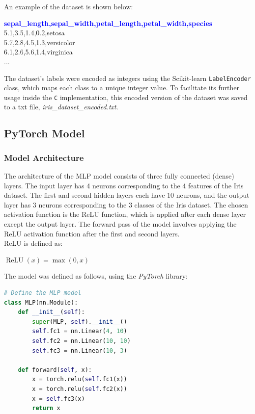 \documentclass{article}
\begin{document}
An example of the dataset is shown below:

\begin{tcolorbox}[colback=gray!5, colframe=black, rounded corners, boxrule=0.1mm]
\textbf{\textcolor{blue}{sepal\_length,sepal\_width,petal\_length,petal\_width,species}} \\
5.1,3.5,1.4,0.2,setosa \\
5.7,2.8,4.5,1.3,versicolor \\
6.1,2.6,5.6,1.4,virginica \\
...
\end{tcolorbox}

The dataset's labels were encoded as integers using the Scikit-learn \texttt{LabelEncoder} class, which maps each class to a unique integer value.
To facilitate its further usage inside the \texttt{C} implementation, this encoded version of the dataset was saved to a txt file, \textit{iris\_dataset\_encoded.txt}.

\subsection{PyTorch Model}
\subsubsection{Model Architecture}
The architecture of the MLP model consists of three fully connected (dense) layers.
The input layer has 4 neurons corresponding to the 4 features of the Iris dataset. 
The first and second hidden layers each have 10 neurons, and the output layer has 3 neurons corresponding to the 3 classes of the Iris dataset.
The chosen activation function is the ReLU function, which is applied after each dense layer except the output layer.
The forward pass of the model involves applying the ReLU activation function after the first and second layers.
\\ReLU is defined as:
\begin{center}
$\operatorname{ReLU}(x) = \max(0, x)$
\end{center}
The model was defined as follows, using the \textit{PyTorch} library:
\begin{lstlisting}[language=Python]
# Define the MLP model
class MLP(nn.Module):
    def __init__(self):
        super(MLP, self).__init__()
        self.fc1 = nn.Linear(4, 10)
        self.fc2 = nn.Linear(10, 10)
        self.fc3 = nn.Linear(10, 3)
    
    def forward(self, x):
        x = torch.relu(self.fc1(x))
        x = torch.relu(self.fc2(x))
        x = self.fc3(x)
        return x
\end{lstlisting}
\end{document}
